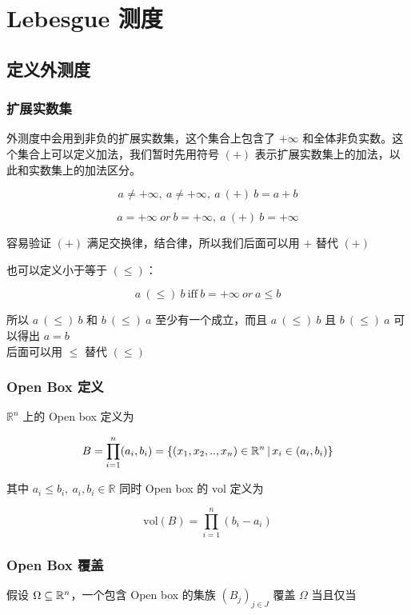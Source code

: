 \section{Lebesgue 测度}

\subsection{定义外测度}

\subsubsection{扩展实数集}

外测度中会用到非负的扩展实数集，这个集合上包含了 $+\infty$ 和全体非负实数。这个集合上可以定义加法，我们暂时先用符号 $\mathit{(+)}$ 表示扩展实数集上的加法，以此和实数集上的加法区分。

\[
    a \ne +\infty, \: a \ne +\infty, \: a \: (+) \: b = a + b 
\]

\[
    a = +\infty \: or \: b = +\infty, \: a \:(+)\: b = +\infty
\]

容易验证 $(+)$ 满足交换律，结合律，所以我们后面可以用 $+$ 替代 $(+)$

 也可以定义小于等于 $(\le)$：

\[
a \:(\le)\: b \: \mathrm{iff} \: b = +\infty \: or \: a \le b
\]

所以 $a \:(\le)\: b$ 和 $b \:(\le)\: a$ 至少有一个成立，而且 $a \:(\le)\: b$ 且 $b \:(\le)\: a$ 可以得出 $a = b$\\
后面可以用 $\le$ 替代 $(\le)$

\subsubsection{Open Box 定义}

$\mathbb{R}^{n}$ 上的 Open box 定义为 

\[
B = \prod_{i=1}^{n}(a_i, b_i) = \{ (x_1, x_2, .., x_n) \in \mathbb{R}^n \,\vert\, x_i \in (a_i, b_i) \}
\]

其中 $a_i \le b_i, \: a_i, b_i \in \mathbb{R}$ 同时 Open box 的 vol 定义为

\[
\mathrm{vol}(B) = \prod_{i=1}^{n}(b_i - a_i)
\]

\subsubsection{Open Box 覆盖}

假设 $\Omega \subseteq \mathbb{R}^n$，一个包含 Open box 的集族 $(B_j)_{j \in J}  $ 覆盖  $ \Omega $ 当且仅当 

